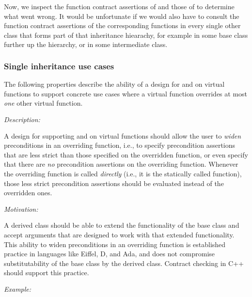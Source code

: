 Now, we inspect the function contract assertions of \allowbreak{} and those of \allowbreak{} to determine what went wrong. It would be unfortunate if we would also have to consult the function contract assertions of the corresponding functions in every single other class that forms part of that inheritance hiearachy, for example \allowbreak{} in some base class further up the hierarchy, or \allowbreak{} in some intermediate class.


\subsubsection{Single inheritance use cases}

The following properties describe the ability of a design  for  and  on virtual functions to support concrete use cases where a virtual function overrides at most \emph{one} other virtual function.


\emph{Description:}

A design for supporting  and  on virtual functions should allow the user to \emph{widen} preconditions in an overriding function, i.e., to specify precondition assertions that are less strict than those specified on the overridden function, or even specify that there are \emph{no} precondition assertions on the overriding function. Whenever the overriding function is called \emph{directly} (i.e., it is the statically called function), those less strict precondition assertions should be evaluated instead of the overridden ones.

\emph{Motivation:}

A derived class should be able to extend the functionality of the base class and accept arguments that are designed to work with that extended functionality. This ability to widen preconditions in an overriding function is established practice in languages like Eiffel, D, and Ada, and does not compromise substitutability of the base class by the derived class. Contract checking in C++ should support this practice.

\emph{Example:}


